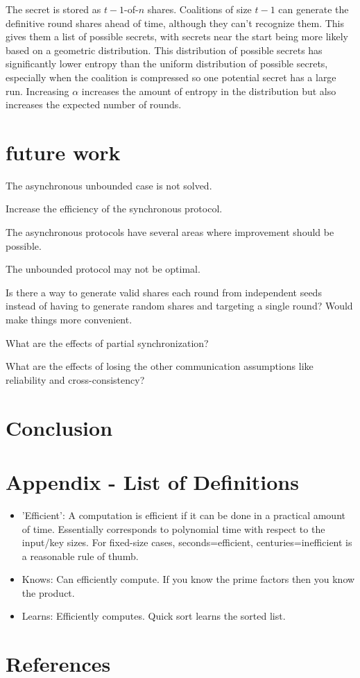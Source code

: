 \documentclass{dalcsthesis}
\begin{document}
The secret is stored as $t-1$-of-$n$ shares. Coalitions of size $t-1$ can generate the definitive round shares ahead of time, although they can't recognize them. This gives them a list of possible secrets, with secrets near the start being more likely based on a geometric distribution. This distribution of possible secrets has significantly lower entropy than the uniform distribution of possible secrets, especially when the coalition is compressed so one potential secret has a large run. Increasing $\alpha$ increases the amount of entropy in the distribution but also increases the expected number of rounds.





\chapter{future work}

The asynchronous unbounded case is not solved.

Increase the efficiency of the synchronous protocol.

The asynchronous protocols have several areas where improvement should be possible.

The unbounded protocol may not be optimal.

Is there a way to generate valid shares each round from independent seeds instead of having to generate random shares and targeting a single round? Would make things more convenient.

What are the effects of partial synchronization?

What are the effects of losing the other communication assumptions like reliability and cross-consistency?




\chapter{Conclusion}



\chapter{Appendix - List of Definitions}

\begin{itemize}
  \item 'Efficient': A computation is efficient if it can be done in a practical amount of time. Essentially corresponds to polynomial time with respect to the input/key sizes. For fixed-size cases, seconds=efficient, centuries=inefficient is a reasonable rule of thumb.
  \item Knows: Can efficiently compute. If you know the prime factors then you know the product.
  \item Learns: Efficiently computes. Quick sort learns the sorted list.
\end{itemize}

\chapter{References}



\end{document}

